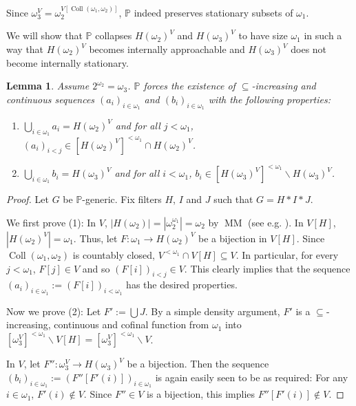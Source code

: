 \documentclass[a4paper]{amsart}
\theoremstyle{definition}
\theoremstyle{remark}
\theoremstyle{plain}
\newtheorem{mylem}[mydef]{Lemma}
\numberwithin{mydef}{section}
\DeclareMathOperator{\Coll}{Coll}
\DeclareMathOperator{\MM}{MM}
\newcommand{\dP}{\mathbb{P}}
\begin{document}
	Since $\omega_3^V=\omega_2^{V[\Coll(\omega_1,\omega_2)]}$, $\dP$ indeed preserves stationary subsets of $\omega_1$.
	
	We will show that $\dP$ collapses $H(\omega_2)^V$ and $H(\omega_3)^V$ to have size $\omega_1$ in such a way that $H(\omega_2)^V$ becomes internally approachable and $H(\omega_3)^V$ does not become internally stationary.
	
	\begin{mylem}\label{PSeq}
		Assume $2^{\omega_2}=\omega_3$. $\dP$ forces the existence of $\subseteq$-increasing and continuous sequences $(a_i)_{i\in\omega_1}$ and $(b_i)_{i\in\omega_1}$ with the following properties:
		\begin{enumerate}
			\item $\bigcup_{i\in\omega_1}a_i=H(\omega_2)^V$ and for all $j<\omega_1$, $(a_i)_{i<j}\in[H(\omega_2)^V]^{<\omega_1}\cap H(\omega_2)^V$.
			\item $\bigcup_{i\in\omega_1}b_i=H(\omega_3)^V$ and for all $i<\omega_1$, $b_i\in[H(\omega_3)^V]^{<\omega_1}\smallsetminus H(\omega_3)^V$.
		\end{enumerate}
	\end{mylem}
	
	\begin{proof}
		Let $G$ be $\dP$-generic. Fix filters $H$, $I$ and $J$ such that $G=H*I*J$.
		
		We first prove (1): In $V$, $|H(\omega_2)|=|\omega_2^{\omega_1}|=\omega_2$ by $\MM$ (see e.g. \cite[Theorem 10]{ForemanMagidorShelahMM}). In $V[H]$, $|H(\omega_2)^V|=\omega_1$. Thus, let $F\colon\omega_1\to H(\omega_2)^V$ be a bijection in $V[H]$. Since $\Coll(\omega_1,\omega_2)$ is countably closed, $V^{<\omega_1}\cap V[H]\subseteq V$. In particular, for every $j<\omega_1$, $F[j]\in V$ and so $(F[i])_{i<j}\in V$. This clearly implies that the sequence $(a_i)_{i\in\omega_1}:=(F[i])_{i<\omega_1}$ has the desired properties.
		
		Now we prove (2): Let $F':=\bigcup J$. By a simple density argument, $F'$ is a $\subseteq$-increasing, continuous and cofinal function from $\omega_1$ into $[\omega_3^V]^{<\omega_1}\smallsetminus V[H]=[\omega_3^V]^{<\omega_1}\smallsetminus V$.
		
		In $V$, let $F''\colon\omega_3^V\to H(\omega_3)^V$ be a bijection. Then the sequence $(b_i)_{i\in\omega_1}:=(F''[F'(i)])_{i\in\omega_1}$ is again easily seen to be as required: For any $i\in\omega_1$, $F'(i)\notin V$. Since $F''\in V$ is a bijection, this implies $F''[F'(i)]\notin V$.
	\end{proof}
	
\end{document}
